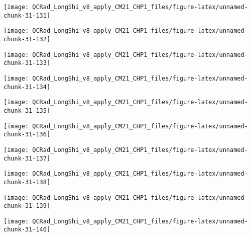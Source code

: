 \documentclass[
  10pt,
  a4paper,oneside]{article}
\begin{document}
\begin{center}\texttt{[image: QCRad\_LongShi\_v8\_apply\_CM21\_CHP1\_files/figure-latex/unnamed-chunk-31-131]} \end{center}

\begin{center}\texttt{[image: QCRad\_LongShi\_v8\_apply\_CM21\_CHP1\_files/figure-latex/unnamed-chunk-31-132]} \end{center}

\begin{center}\texttt{[image: QCRad\_LongShi\_v8\_apply\_CM21\_CHP1\_files/figure-latex/unnamed-chunk-31-133]} \end{center}

\begin{center}\texttt{[image: QCRad\_LongShi\_v8\_apply\_CM21\_CHP1\_files/figure-latex/unnamed-chunk-31-134]} \end{center}

\begin{center}\texttt{[image: QCRad\_LongShi\_v8\_apply\_CM21\_CHP1\_files/figure-latex/unnamed-chunk-31-135]} \end{center}

\begin{center}\texttt{[image: QCRad\_LongShi\_v8\_apply\_CM21\_CHP1\_files/figure-latex/unnamed-chunk-31-136]} \end{center}

\begin{center}\texttt{[image: QCRad\_LongShi\_v8\_apply\_CM21\_CHP1\_files/figure-latex/unnamed-chunk-31-137]} \end{center}

\begin{center}\texttt{[image: QCRad\_LongShi\_v8\_apply\_CM21\_CHP1\_files/figure-latex/unnamed-chunk-31-138]} \end{center}

\begin{center}\texttt{[image: QCRad\_LongShi\_v8\_apply\_CM21\_CHP1\_files/figure-latex/unnamed-chunk-31-139]} \end{center}

\begin{center}\texttt{[image: QCRad\_LongShi\_v8\_apply\_CM21\_CHP1\_files/figure-latex/unnamed-chunk-31-140]} \end{center}
\end{document}
